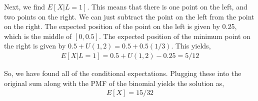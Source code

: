 \documentclass{article}
\begin{document}
Next, we find $E[X | L = 1]$. This means that there is one point on the left, and two points on the right. We can just subtract the point on the left from the point on the right. The expected position of the point on the left is given by 0.25, which is the middle of $[0, 0.5]$. The expected position of the minimum point on the right is given by $0.5 + U(1, 2) = 0.5 + 0.5 (1/3)$. This yields,
\begin{align*}
    E[X | L = 1] = 0.5 + U(1, 2) - 0.25 = 5/12
\end{align*}

So, we have found all of the conditional expectations. Plugging these into the original sum along with the PMF of the binomial yields the solution as,
\begin{align*}
    E[X] = 15/32
\end{align*}
\end{document}
